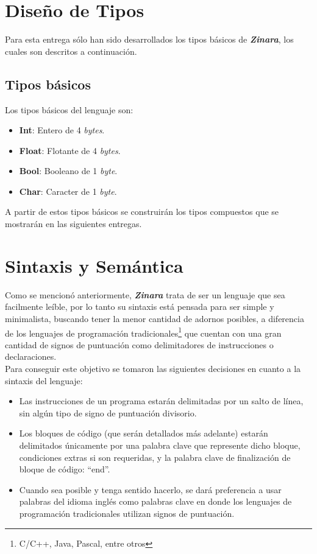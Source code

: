 \documentclass[12pt, spanish]{report}
\begin{document}
\section{Diseño de Tipos}
\label{sec:tipos}

Para esta entrega sólo han sido desarrollados los tipos básicos de
\emph{\textbf{Zinara}}, los cuales son descritos a continuación.

\subsection{Tipos básicos}
\label{sec:tiposbasicos}

Los tipos b\'asicos del lenguaje son:

\begin{itemize}
\item \textbf{Int}: Entero de 4 \emph{bytes}.
\item \textbf{Float}: Flotante de 4 \emph{bytes}.
\item \textbf{Bool}: Booleano de 1 \emph{byte}.
\item \textbf{Char}: Caracter de 1 \emph{byte}.
\end{itemize}

A partir de estos tipos básicos se construirán los tipos compuestos
que se mostrarán en las siguientes entregas.

\section{Sintaxis y Sem\'antica}
\label{sec:synsem}

Como se mencionó anteriormente, \emph{\textbf{Zinara}} trata de ser un
lenguaje que sea facilmente leíble, por lo tanto su sintaxis está
pensada para ser simple y minimalista, buscando tener la menor
cantidad de adornos posibles, a diferencia de los lenguajes de
programación tradicionales\footnote{C/C++, Java, Pascal, entre otros}
que cuentan con una gran cantidad de signos de puntuación como
delimitadores de instrucciones o declaraciones.\\

Para conseguir este objetivo se tomaron las siguientes decisiones en
cuanto a la sintaxis del lenguaje:

\begin{itemize}
\item Las instrucciones de un programa estarán delimitadas por un
  salto de línea, sin algún tipo de signo de puntuación divisorio.

\item Los bloques de código (que serán detallados más adelante)
  estarán delimitados únicamente por una palabra clave que represente
  dicho bloque, condiciones extras si son requeridas, y la palabra
  clave de finalización de bloque de código: ``end''.

\item Cuando sea posible y tenga sentido hacerlo, se dará preferencia
  a usar palabras del idioma inglés como palabras clave en donde los
  lenguajes de programación tradicionales utilizan signos de
  puntuación.
\end{itemize}
\end{document}
